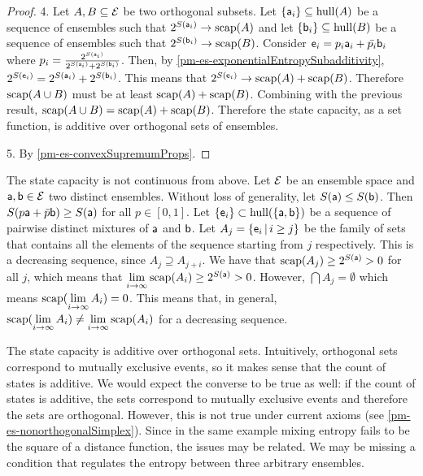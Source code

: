\begin{mathSection}
\begin{proof}
	4. Let $A, B \subseteq \Ens$ be two orthogonal subsets. Let $\{\ens[a]_i\} \subseteq \hull(A)$ be a sequence of ensembles such that $2^{S(\ens[a]_i)} \to \scap(A)$ and let $\{\ens[b]_i\} \subseteq \hull(B)$ be a sequence of ensembles such that $2^{S(\ens[b]_i)} \to \scap(B)$. Consider $\ens_i = p_i \ens[a]_i + \bar{p_i} \ens[b]_i$ where $p_i = \frac{2^{S(\ens[a]_i)}}{2^{S(\ens[a]_i)} + 2^{S(\ens[b]_i)}}$. Then, by \ref{pm-es-exponentialEntropySubadditivity}, $2^{S(\ens_i)} = 2^{S(\ens[a]_i)} + 2^{S(\ens[b]_i)}$. This means that $2^{S(\ens_i)} \to \scap(A) + \scap(B)$. Therefore $\scap(A \cup B)$ must be at least $\scap(A) + \scap(B)$. Combining with the previous result, $\scap(A \cup B) = \scap(A) + \scap(B)$. Therefore the state capacity, as a set function, is additive over orthogonal sets of ensembles.

	5. By \ref{pm-es-convexSupremumProps}.
\end{proof}

\begin{remark}
	The state capacity is not continuous from above. Let $\Ens$ be an ensemble space and $\ens[a], \ens[b] \in \Ens$ two distinct ensembles. Without loss of generality, let $S(\ens[a]) \leq S(\ens[b])$. Then $S(p \ens[a] + \bar{p} \ens[b]) \geq S(\ens[a])$ for all $p \in [0,1]$. Let $\{ \ens_i \} \subset \hull(\{\ens[a], \ens[b]\})$ be a sequence of pairwise distinct mixtures of $\ens[a]$ and $\ens[b]$. Let $A_j = \{ \ens_i \, | \, i \geq j\}$ be the family of sets that contains all the elements of the sequence starting from $j$ respectively. This is a decreasing sequence, since $A_j \supseteq A_{j+i}$. We have that $\scap(A_j) \geq 2^{S(\ens[a])} > 0$ for all $j$, which means that $\lim\limits_{i \to \infty} \scap(A_i) \geq 2^{S(\ens[a])} > 0$. However, $\bigcap A_j = \emptyset$ which means $\scap(\lim\limits_{i \to \infty} A_i) = 0$. This means that, in general, $\scap(\lim\limits_{i \to \infty} A_i) \neq \lim\limits_{i \to \infty} \scap(A_i)$ for a decreasing sequence.
\end{remark}

\end{mathSection}

The state capacity is additive over orthogonal sets. Intuitively, orthogonal sets correspond to mutually exclusive events, so it makes sense that the count of states is additive. We would expect the converse to be true as well: if the count of states is additive, the sets correspond to mutually exclusive events and therefore the sets are orthogonal. However, this is not true under current axioms (see \ref{pm-es-nonorthogonalSimplex}). Since in the same example mixing entropy fails to be the square of a distance function, the issues may be related. We may be missing a condition that regulates the entropy between three arbitrary ensembles.

